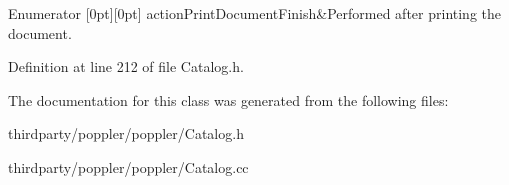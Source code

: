 \begin{DoxyEnumFields}{Enumerator}
[0pt][0pt]{}\mbox{\label{class_catalog_acd1ae95dd8f85f0dae630c8904dcfb6eaf4d1ee724bdb0fee3e99dd3720e304b1}} 
action\+Print\+Document\+Finish&Performed after printing the document. \\
\hline

\end{DoxyEnumFields}


Definition at line 212 of file Catalog.\+h.



The documentation for this class was generated from the following files\+:\begin{DoxyCompactItemize}
\item 
thirdparty/poppler/poppler/Catalog.\+h\item 
thirdparty/poppler/poppler/Catalog.\+cc\end{DoxyCompactItemize}
